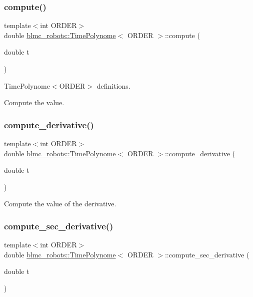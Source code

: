 \subsubsection{\texorpdfstring{compute()}{compute()}}
{\footnotesize\ttfamily template$<$int O\+R\+D\+ER$>$ \\
double \hyperlink{classblmc__robots_1_1TimePolynome}{blmc\+\_\+robots\+::\+Time\+Polynome}$<$ O\+R\+D\+ER $>$\+::compute (\begin{DoxyParamCaption}\item[{double}]{t }\end{DoxyParamCaption})}



Time\+Polynome$<$\+O\+R\+D\+E\+R$>$ definitions. 

Compute the value. \mbox{\label{classblmc__robots_1_1TimePolynome_a089cd5e46da974828cfb1b042119c163}} 
\subsubsection{\texorpdfstring{compute\+\_\+derivative()}{compute\_derivative()}}
{\footnotesize\ttfamily template$<$int O\+R\+D\+ER$>$ \\
double \hyperlink{classblmc__robots_1_1TimePolynome}{blmc\+\_\+robots\+::\+Time\+Polynome}$<$ O\+R\+D\+ER $>$\+::compute\+\_\+derivative (\begin{DoxyParamCaption}\item[{double}]{t }\end{DoxyParamCaption})}

Compute the value of the derivative. \mbox{\label{classblmc__robots_1_1TimePolynome_a3402f5a2e56b7ef46d93342f8c208bd1}} 
\subsubsection{\texorpdfstring{compute\+\_\+sec\+\_\+derivative()}{compute\_sec\_derivative()}}
{\footnotesize\ttfamily template$<$int O\+R\+D\+ER$>$ \\
double \hyperlink{classblmc__robots_1_1TimePolynome}{blmc\+\_\+robots\+::\+Time\+Polynome}$<$ O\+R\+D\+ER $>$\+::compute\+\_\+sec\+\_\+derivative (\begin{DoxyParamCaption}\item[{double}]{t }\end{DoxyParamCaption})}

